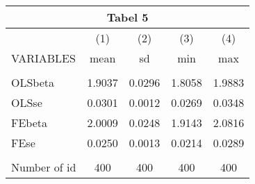 \documentclass[]{article}
\begin{document}
\begin{tabular}{lcccc}
\multicolumn{5}{c}{Tabel 5} \\ \hline
 & (1) & (2) & (3) & (4) \\
VARIABLES & mean & sd & min & max \\ \hline
 &  &  &  &  \\
OLSbeta & 1.9037 & 0.0296 & 1.8058 & 1.9883 \\
OLSse & 0.0301 & 0.0012 & 0.0269 & 0.0348 \\
FEbeta & 2.0009 & 0.0248 & 1.9143 & 2.0816 \\
FEse & 0.0250 & 0.0013 & 0.0214 & 0.0289 \\
 &  &  &  &  \\
 Number of id & 400 & 400 & 400 & 400 \\ \hline
\end{tabular}
\end{document}
